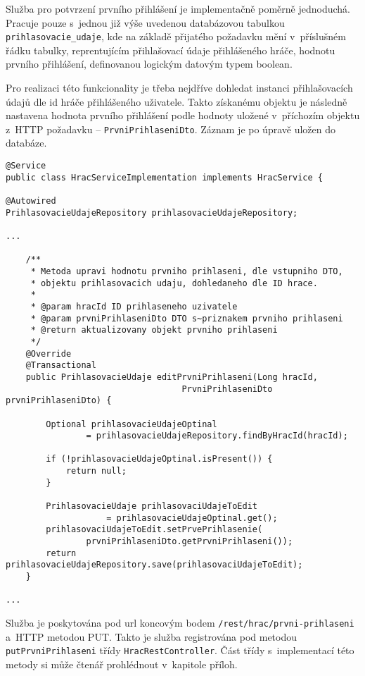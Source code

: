 \documentclass[12pt]{article}
\begin{document}
{Služba pro potvrzení prvního přihlášení je implementačně poměrně jednoduchá. Pracuje pouze s~jednou již výše uvedenou databázovou tabulkou \texttt{prihlasovacie\_udaje}, kde na základě přijatého požadavku mění v~příslušném řádku tabulky, reprentujícím přihlašovací údaje přihlášeného hráče, hodnotu prvního přihlášení, definovanou logickým datovým typem boolean. 

Pro realizaci této funkcionality je třeba nejdříve dohledat instanci přihlašovacích údajů dle id hráče přihlášeného uživatele. Takto získanému objektu je následně nastavena hodnota prvního přihlášení podle hodnoty uložené v~příchozím objektu z~HTTP požadavku -- \texttt{PrvniPrihlaseniDto}.  Záznam je po úpravě uložen do databáze. 

\clearpage

\begin{lstlisting}
@Service
public class HracServiceImplementation implements HracService {

@Autowired
PrihlasovacieUdajeRepository prihlasovacieUdajeRepository;

...

    /**
     * Metoda upravi hodnotu prvniho prihlaseni, dle vstupniho DTO,
     * objektu prihlasovacich udaju, dohledaneho dle ID hrace.
     * 
     * @param hracId ID prihlaseneho uzivatele
     * @param prvniPrihlaseniDto DTO s~priznakem prvniho prihlaseni
     * @return aktualizovany objekt prvniho prihlaseni
     */
    @Override
    @Transactional
    public PrihlasovacieUdaje editPrvniPrihlaseni(Long hracId,
                                   PrvniPrihlaseniDto prvniPrihlaseniDto) {

        Optional prihlasovacieUdajeOptinal
                = prihlasovacieUdajeRepository.findByHracId(hracId);

        if (!prihlasovacieUdajeOptinal.isPresent()) {
            return null;
        }

        PrihlasovacieUdaje prihlasovaciUdajeToEdit 
                    = prihlasovacieUdajeOptinal.get();
        prihlasovaciUdajeToEdit.setPrvePrihlasenie(
                prvniPrihlaseniDto.getPrvniPrihlaseni());
        return prihlasovacieUdajeRepository.save(prihlasovaciUdajeToEdit);
    }

...
\end{lstlisting}

Služba je poskytována pod url koncovým bodem \texttt{/rest/hrac/prvni-prihlaseni} a~HTTP metodou PUT.  Takto je služba registrována pod metodou \texttt{putPrvniPrihlaseni} třídy \texttt{HracRestController}.
Část třídy s~implementací této metody si může čtenář prohlédnout v~kapitole příloh.

}
\end{document}
